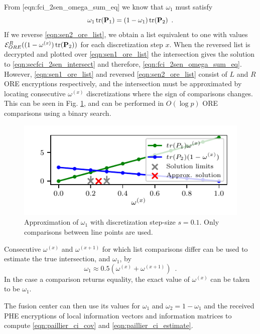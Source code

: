 From [eqn:fci\_2sen\_omega\_sum\_eq] we know that $\omega_1$ must satisfy
\begin{equation}
   \omega_1 \operatorname{tr}({{\mathbf{P}}}_1) = (1-\omega_1)\operatorname{tr}({{\mathbf{P}}}_2)\enspace. \label{eqn:secfci_2sen_intersect}
\end{equation}
If we reverse \eqref{eqn:sen2_ore_list}, we obtain a list equivalent to one with values $\mathcal{E}^R_{ORE}((1-\omega^{(x)})\operatorname{tr}({{\mathbf{P}}}_2))$ for each discretization step $x$. When the reversed list is decrypted and plotted over \eqref{eqn:sen1_ore_list} the intersection gives the solution to \eqref{eqn:secfci_2sen_intersect} and therefore, \eqref{eqn:fci_2sen_omega_sum_eq}. However, \eqref{eqn:sen1_ore_list} and reversed \eqref{eqn:sen2_ore_list} consist of $L$ and $R$ ORE encryptions respectively, and the intersection must be approximated by locating consecutive $\omega^{(x)}$ discretizations where the sign of comparisons changes. This can be seen in Fig. \ref{fig:2_sensor_sol}, and can be performed in $O(\log{p})$ ORE comparisons using a binary search.
\begin{figure}[tb]
   \begin{center}
      \includegraphics{figures/2_sensors.pdf}
   \end{center}
   \caption{Approximation of $\omega_1$ with discretization step-size $s=0.1$. Only comparisons between line points are used.}
   \label{fig:2_sensor_sol}
\end{figure}
Consecutive $\omega^{(x)}$ and $\omega^{(x+1)}$ for which list comparisons differ can be used to estimate the true intersection, and $\omega_1$, by
\begin{equation}
   \omega_1 \approx 0.5(\omega^{(x)} + \omega^{(x+1)})\enspace. \label{eqn:secfci_2sen_omega}
\end{equation}
In the case a comparison returns equality, the exact value of $\omega^{(x)}$ can be taken to be $\omega_1$.

The fusion center can then use its values for $\omega_1$ and $\omega_2 = 1-\omega_1$ and the received PHE encryptions of local information vectors and information matrices to compute \eqref{eqn:paillier_ci_cov} and \eqref{eqn:paillier_ci_estimate}.

